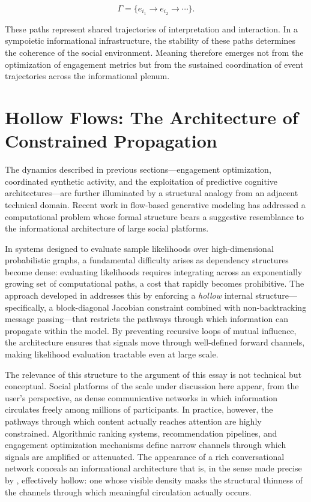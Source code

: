 \documentclass[12pt,a4paper]{article}
\begin{document}
\[
\Gamma = \{e_{i_1} \to e_{i_2} \to \cdots\}.
\]

These paths represent shared trajectories of interpretation and interaction. In a sympoietic
informational infrastructure, the stability of these paths determines the coherence of the
social environment. Meaning therefore emerges not from the optimization of engagement metrics
but from the sustained coordination of event trajectories across the informational plenum.

\section{Hollow Flows: The Architecture of Constrained Propagation}

The dynamics described in previous sections---engagement optimization, coordinated synthetic
activity, and the exploitation of predictive cognitive architectures---are further illuminated
by a structural analogy from an adjacent technical domain. Recent work in flow-based generative
modeling has addressed a computational problem whose formal structure bears a suggestive
resemblance to the informational architecture of large social platforms.

In systems designed to evaluate sample likelihoods over high-dimensional probabilistic graphs,
a fundamental difficulty arises as dependency structures become dense: evaluating likelihoods
requires integrating across an exponentially growing set of computational paths, a cost that
rapidly becomes prohibitive. The approach developed in \citet{gloy2025} addresses this by
enforcing a \emph{hollow} internal structure---specifically, a block-diagonal Jacobian
constraint combined with non-backtracking message passing---that restricts the pathways through
which information can propagate within the model. By preventing recursive loops of mutual
influence, the architecture ensures that signals move through well-defined forward channels,
making likelihood evaluation tractable even at large scale.

The relevance of this structure to the argument of this essay is not technical but conceptual.
Social platforms of the scale under discussion here appear, from the user's perspective, as
dense communicative networks in which information circulates freely among millions of
participants. In practice, however, the pathways through which content actually reaches attention
are highly constrained. Algorithmic ranking systems, recommendation pipelines, and engagement
optimization mechanisms define narrow channels through which signals are amplified or
attenuated. The appearance of a rich conversational network conceals an informational
architecture that is, in the sense made precise by \citet{gloy2025}, effectively hollow: one
whose visible density masks the structural thinness of the channels through which meaningful
circulation actually occurs.
\end{document}
